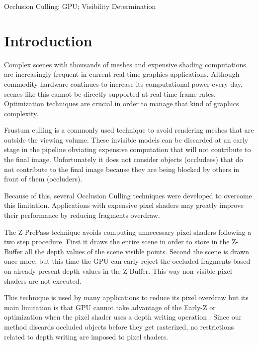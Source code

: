 \documentclass[10pt, conference]{IEEEtran}
\begin{document}
\begin{IEEEkeywords}
Occlusion Culling; GPU; Visibility Determination

\end{IEEEkeywords}


\IEEEpeerreviewmaketitle




\section{Introduction}
%
Complex scenes with thousands of meshes and expensive shading computations are increasingly frequent in current real-time graphics applications. 
Although commodity hardware continues to increase its computational power every day, scenes like this cannot be directly supported at real-time frame rates. 
Optimization techniques are crucial in order to manage that kind of graphics complexity.\

Frustum culling is a commonly used technique to avoid rendering meshes that are outside the viewing volume. 
These invisible models can be discarded at an early stage in the pipeline obviating expensive computation that will not contribute to the final image. 
Unfortunately it does not consider objects (occludees) that do not contribute to the final image because they are being blocked by others in front of them (occluders).\

Because of this, several Occlusion Culling techniques were developed to overcome this limitation. 
Applications with expensive pixel shaders may greatly improve their performance by reducing fragments overdraw.\

The Z-PrePass \cite{z_pre_pass} technique avoids computing unnecessary pixel shaders following a two step procedure. 
First it draws the entire scene in order to store in the Z-Buffer all the depth values of the scene visible points. 
Second the scene is drawn once more, but this time the GPU can early reject the occluded fragments based on already present depth values in the Z-Buffer. 
This way non visible pixel shaders are not executed.\

This technique is used by many applications to reduce its pixel overdraw but its main limitation is that GPU cannot take advantage of the Early-Z \cite{early_z} or 
\cite{HyperZ} optimization when the pixel shader uses a depth writing operation \cite{z_correct_bump_1, z_correct_bump_2}. 
Since our method discards occluded objects before they get rasterized, no restrictions related to depth writing are imposed to pixel shaders.\
\end{document}
